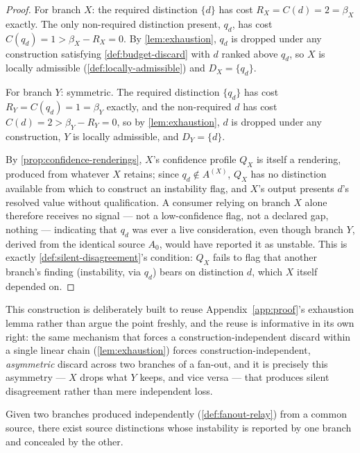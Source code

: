 \begin{proof}
For branch $X$: the required distinction $\{d\}$ has cost $R_X = C(d) = 2
= \beta_X$ exactly. The only non-required distinction present, $q_d$, has
cost $C(q_d) = 1 > \beta_X - R_X = 0$. By \cref{lem:exhaustion}, $q_d$ is
dropped under any construction satisfying \cref{def:budget-discard} with
$d$ ranked above $q_d$, so $X$ is locally admissible
(\cref{def:locally-admissible}) and $D_X = \{q_d\}$.

For branch $Y$: symmetric. The required distinction $\{q_d\}$ has cost
$R_Y = C(q_d) = 1 = \beta_Y$ exactly, and the non-required $d$ has cost
$C(d) = 2 > \beta_Y - R_Y = 0$, so by \cref{lem:exhaustion}, $d$ is
dropped under any construction, $Y$ is locally admissible, and $D_Y =
\{d\}$.

By \cref{prop:confidence-renderings}, $X$'s confidence profile $Q_X$ is
itself a rendering, produced from whatever $X$ retains; since $q_d \notin
A^{(X)}$, $Q_X$ has no distinction available from which to construct an
instability flag, and $X$'s output presents $d$'s resolved value without
qualification. A consumer relying on branch $X$ alone therefore receives
no signal --- not a low-confidence flag, not a declared gap, nothing ---
indicating that $q_d$ was ever a live consideration, even though branch
$Y$, derived from the identical source $A_0$, would have reported it as
unstable. This is exactly \cref{def:silent-disagreement}'s condition:
$Q_X$ fails to flag that another branch's finding (instability, via
$q_d$) bears on distinction $d$, which $X$ itself depended on.
\end{proof}

This construction is deliberately built to reuse
Appendix~\ref{app:proof}'s exhaustion lemma rather than argue the point
freshly, and the reuse is informative in its own right: the same
mechanism that forces a construction-independent discard within a single
linear chain (\cref{lem:exhaustion}) forces construction-independent,
\emph{asymmetric} discard across two branches of a fan-out, and it is
precisely this asymmetry --- $X$ drops what $Y$ keeps, and vice versa ---
that produces silent disagreement rather than mere independent loss.

\begin{proposition}
\label{prop:silent-disagreement}
Given two branches produced independently (\cref{def:fanout-relay}) from
a common source, there exist source distinctions whose instability is
reported by one branch and concealed by the other.
\end{proposition}

